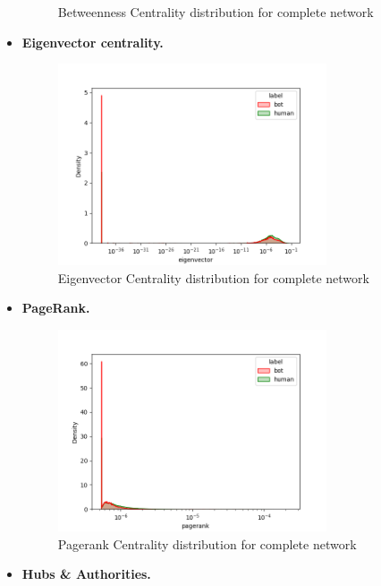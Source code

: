 \documentclass[12pt, a4paper]{article}
\begin{document}
\begin{itemize}
\begin{figure}[H]
                    \caption{Betweenness Centrality distribution for complete network}
                \end{figure}
			\item \textbf{Eigenvector centrality.}
				\begin{figure}[H]
                    \centering
                    \includegraphics[width=0.75\textwidth]{complete_eigenvector.png}
                    \caption{Eigenvector Centrality distribution for complete network}
                \end{figure}      
			\item \textbf{PageRank.}
                \begin{figure}[H]
                    \centering
                    \includegraphics[width=0.75\textwidth]{complete_pagerank.png}
                    \caption{Pagerank Centrality distribution for complete network}
                \end{figure}
            \item \textbf{Hubs \& Authorities.}
                \begin{figure}[H]
                    \centering

\end{figure}
\end{itemize}
\end{document}
